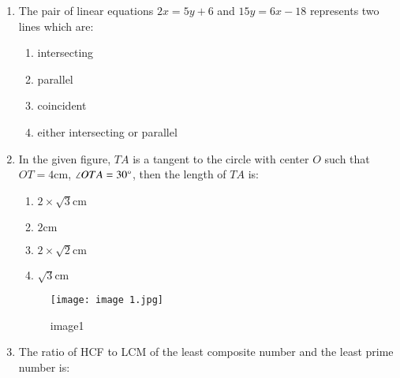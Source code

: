 \documentclass[12pt,-letter paper]{article}
\begin{document}
\begin{enumerate}
    \item The pair of linear equations $2x = 5y + 6$ and $15y = 6x - 18$ represents two lines which are:
    \begin{enumerate}
        \item intersecting
        \item parallel
        \item coincident
        \item either intersecting or parallel
    \end{enumerate}
    
    \item In the given figure, $TA$ is a tangent to the circle with center $O$ such that $OT = 4\mathrm{cm}$, $\angle OTA = 30\degree$, then the length of $TA$ is:
    \begin{enumerate}
        \item $2 \times \sqrt{3} \mathrm{cm}$
        \item $2\mathrm{cm}$
        \item $2 \times \sqrt{2}\mathrm{cm}$
        \item $\sqrt{3}\mathrm{cm}$
    \end{enumerate}
\newpage
\begin{figure}[!ht]
\centering
\texttt{[image: image 1.jpg]}
\label{fig:image1}
	\caption{image1}
\end{figure}

\item The ratio of HCF to LCM of the least composite number and the least prime number is:


\end{enumerate}
\end{document}
